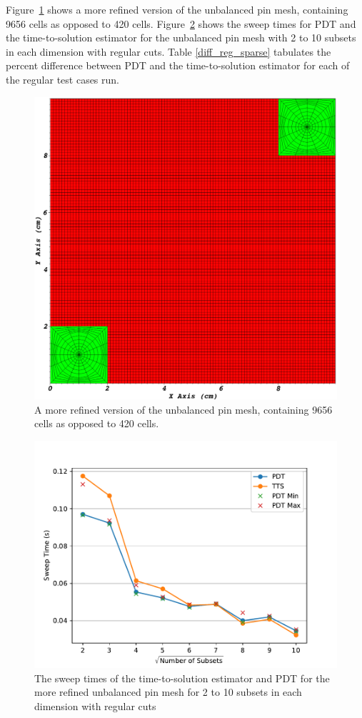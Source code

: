 \FloatBarrier
Figure~\ref{ubp_more_sparse} shows a more refined version of the unbalanced pin mesh, containing 9656 cells as opposed to 420 cells. 
Figure~\ref{comp_reg_sparse} shows the sweep times for PDT and the time-to-solution estimator for the unbalanced pin mesh with 2 to 10 subsets in each dimension with regular cuts.
Table \ref{diff_reg_sparse} tabulates the percent difference between PDT and the time-to-solution estimator for each of the regular test cases run.
\begin{figure}[H]
\centering
\includegraphics[scale=0.28]{../../figures/unbalanced_pins_more_sparse.png}
\caption{A more refined version of the unbalanced pin mesh, containing 9656 cells as opposed to 420 cells.}
\label{ubp_more_sparse}
\end{figure}
\begin{figure}[h]
\centering
\includegraphics{../../figures/more_sparse_reg_pdtvtts.pdf}
\caption{The sweep times of the time-to-solution estimator and PDT for the more refined unbalanced pin mesh for 2 to 10 subsets in each dimension with regular cuts}
\label{comp_reg_sparse}
\end{figure}
